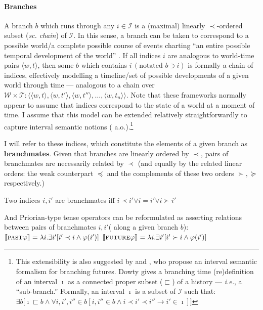 \documentclass[11pt,dvipsnames]{report}
\providecommand{\denote}[2][]{\ensuremath{\llbracket{#2}\rrbracket^{#1}}}
\begin{document}
\paragraph{Branches} A branch $b $ which runs through any $ i\in\mathcal I $ is a (maximal) linearly $ \prec $-ordered subset (\textit{sc.} \textit{chain}) of $ \mathcal I $. In this sense, a branch can be taken to correspond to a possible world/a complete possible course of events charting ``an entire possible temporal development of the world'' \citep[148]{Rumberg2019}. If all indices $ i$ are analogous to world-time pairs $\langle w,t\rangle $, then some $ b$ which contains $ i\, (\text{notated }b\ni i)$ is formally a chain of indices, effectively modelling a timeline/set of possible developments of a given world through time --- analogous to a chain over $ \mathcal{W\times T}:\big\langle\langle w,t\rangle,\langle w,t'\rangle,\langle w,t''\rangle,\allowbreak\hdots,\langle w,t_n\rangle\big\rangle$. Note that these frameworks normally appear to assume that indices correspond to the state of a world at a moment of time. I assume that this model can be extended relatively straightforwardly to capture interval semantic notions (\citealp[\textit{e.g.},][]{Landman1991,Dowty1982,Bennett} a.o.).\footnote{This extensibility is also suggested by \citet{Dowty1977} and \citet{Tedeschi1981}, who propose an interval semantic formalism for branching futures. Dowty gives a branching time (re)definition of an interval $ \boldsymbol\imath $ as a connected proper subset ($ \sqsubset $) of a history \citeyearpar[64]{Dowty1977} --- \textit{i.e.}, a ``sub-branch.'' Formally, an interval $ \boldsymbol\imath $ is a subset of $ \mathcal I $ such that: $\exists b\big[\boldsymbol\imath\sqsubset b\wedge\forall i,i',i''\in b[i,i''\in b\wedge i\prec i'\prec i''\to i'\in\boldsymbol\imath]\big] $\label{fn:intervals}}

I will refer to these indices, which constitute the elements of a given branch as \textbf{branchmates}. Given that branches are linearly ordered by $ \prec $, pairs of branchmates are necessarily related by $ \prec $ (and equally by the related linear orders: the weak counterpart $\boldsymbol\preccurlyeq$ and the complements of these two orders $\succ,\succcurlyeq $ respectively.)


\pex Two indices $ i,i' $ are branchmates iff $ i\prec i'\boldsymbol\vee i=i'\boldsymbol\vee i\succ i' $

\xe
And Priorian-type tense operators can be reformulated as asserting relations between pairs of branchmates $ i,i' $( along a given branch $ b $):
\pex
\a$\denote{\textsc{past} \varphi }=\lambda i.\exists i'[i'\prec i\wedge\varphi (i')]$
\a$\denote{\textsc{future} \varphi }=\lambda i.\exists i'[i'\succ i\wedge\varphi (i')]$
\end{document}
